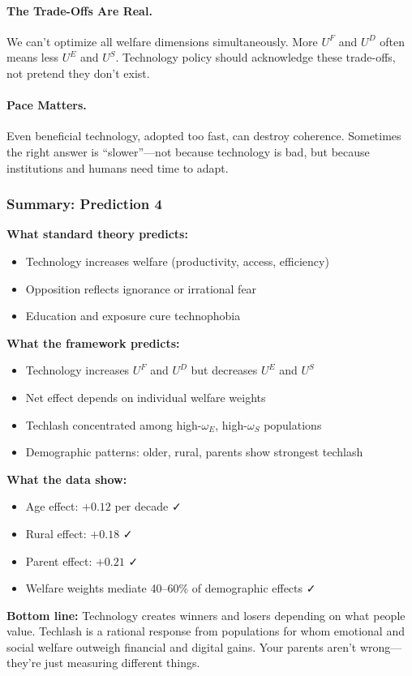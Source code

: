 \paragraph{The Trade-Offs Are Real.}

We can't optimize all welfare dimensions simultaneously. More $U^F$ and $U^D$ 
often means less $U^E$ and $U^S$. Technology policy should acknowledge 
these trade-offs, not pretend they don't exist.

\paragraph{Pace Matters.}

Even beneficial technology, adopted too fast, can destroy coherence. 
Sometimes the right answer is ``slower''---not because technology is 
bad, but because institutions and humans need time to adapt.

\subsubsection{Summary: Prediction 4}

\begin{tcolorbox}[colback=gray!5!white, colframe=gray!75!black, title=Prediction 4: Techlash]
\textbf{What standard theory predicts:}
\begin{itemize}
    \item Technology increases welfare (productivity, access, efficiency)
    \item Opposition reflects ignorance or irrational fear
    \item Education and exposure cure technophobia
\end{itemize}

\textbf{What the framework predicts:}
\begin{itemize}
    \item Technology increases $U^F$ and $U^D$ but decreases $U^E$ and $U^S$
    \item Net effect depends on individual welfare weights
    \item Techlash concentrated among high-$\omega_E$, high-$\omega_S$ populations
    \item Demographic patterns: older, rural, parents show strongest techlash
\end{itemize}

\textbf{What the data show:}
\begin{itemize}
    \item Age effect: $+0.12$ per decade ✓
    \item Rural effect: $+0.18$ ✓
    \item Parent effect: $+0.21$ ✓
    \item Welfare weights mediate 40--60\% of demographic effects ✓
\end{itemize}

\textbf{Bottom line:} Technology creates winners and losers depending on 
what people value. Techlash is a rational response from populations for 
whom emotional and social welfare outweigh financial and digital gains. 
Your parents aren't wrong---they're just measuring different things.
\end{tcolorbox}


